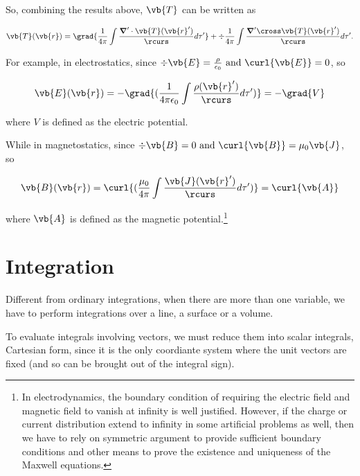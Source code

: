 \documentclass[english,a4paper,12pt]{report}
\begin{document}
	So, combining the results above, \(\vb{T} \) can be written as

\begin{equation}
	\vb{T} (\vb{r} ) = \grad{\frac{1}{4\pi } \int \frac{\boldsymbol{\nabla}' \cdot \vb{T} (\vb{r} ')}{\rcurs }d\tau ' } + \div{\frac{1}{4\pi } \int \frac{\boldsymbol{\nabla}' \cross \vb{T} (\vb{r} ')}{\rcurs } d\tau '} .	
\end{equation}
	
For example, in electrostatics, since \(\div{\vb{E} } = \frac{\rho }{\epsilon_0}  \text{ and } \curl{\vb{E} } = 0\), so
	
\begin{equation}
	\vb{E} (\vb{r} ) = -\grad{(\frac{1}{4\pi\epsilon_0} \int \frac{\rho (\vb{r} ')}{\rcurs } d\tau ')} = -\grad{V} 
\end{equation}
	
where \(V\) is defined as the electric potential.

While in magnetostatics, since \(\div{\vb{B} } = 0 \text{ and } \curl{\vb{B} } = \mu_0 \vb{J} \), so

\begin{equation}
	\vb{B} (\vb{r} ) = \curl{(\frac{\mu_0}{4\pi } \int \frac{\vb{J} (\vb{r} ')}{\rcurs } d\tau ')} = \curl{\vb{A} } 
\end{equation}

where \(\vb{A} \) is defined as the magnetic potential.\footnote{In electrodynamics, the boundary condition of requiring the electric field and magnetic field to vanish at infinity is well justified. However, if the charge or current distribution extend to infinity in some artificial problems as well, then we have to rely on symmetric argument to provide sufficient boundary conditions and other means to prove the existence and uniqueness of the Maxwell equations.}






\chapter{Integration}

Different from ordinary integrations, when there are more than one variable, we have to perform integrations over a line, a surface or a volume.

To evaluate integrals involving vectors, we must reduce them into scalar integrals, \ie Cartesian form, since it is the only coordiante system where the unit vectors are fixed (and so can be brought out of the integral sign).
\end{document}
